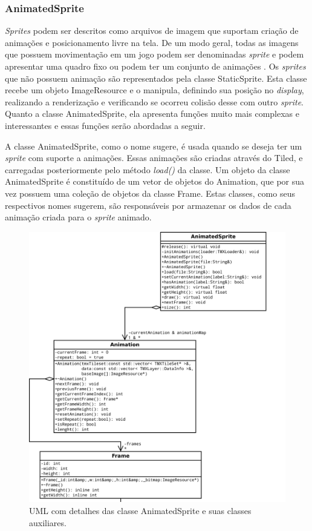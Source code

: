 \subsubsection{AnimatedSprite}
%
%
\textit{Sprites} podem ser descritos como arquivos de imagem que suportam criação de animações e posicionamento livre na tela. De um modo geral, todas as imagens que possuem movimentação em um jogo podem ser denominadas \textit{sprite} e podem apresentar uma quadro fixo ou podem ter um conjunto de animações \cite{Novatec}. Os \textit{sprites} que não possuem animação são representados pela classe StaticSprite. Esta classe recebe um objeto ImageResource e o manipula, definindo sua posição no \textit{display}, realizando a renderização e verificando se ocorreu colisão desse com outro \textit{sprite}. Quanto a classe AnimatedSprite, ela apresenta funções muito mais complexas e interessantes e essas funções serão abordadas a seguir.
\par 
A classe AnimatedSprite, como o nome sugere, é usada quando se deseja ter um \textit{sprite} com suporte a animações. Essas animações são criadas através do Tiled, e carregadas posteriormente pelo método \textit{load()} da classe. Um objeto da classe AnimatedSprite é constituído de um vetor de objetos do Animation, que por sua vez possuem uma coleção de objetos da classe Frame. Estas classes, como seus respectivos nomes sugerem, são responsáveis por armazenar os dados de cada animação criada para o \textit{sprite} animado.
%
%
%
\begin{figure}[H]
    \centering
    \includegraphics[scale = 0.40]{uml/AnimatedSprite.png}
    \caption{UML com detalhes das classe AnimatedSprite e suas classes auxiliares.}
    \label{AnimatedSprite}
\end{figure}
